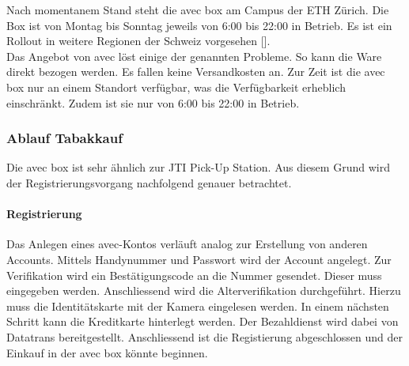  Nach momentanem Stand steht die avec box am Campus der ETH Zürich. Die Box ist von Montag bis Sonntag jeweils von 6:00 bis 22:00 in Betrieb. Es ist ein Rollout in weitere Regionen der Schweiz vorgesehen [\cite{avecBoxStand}].\\
 Das Angebot von avec löst einige der genannten Probleme. So kann die Ware direkt bezogen werden. Es fallen keine Versandkosten an. Zur Zeit ist die avec box nur an einem Standort verfügbar, was die Verfügbarkeit erheblich einschränkt. Zudem ist sie nur von 6:00 bis 22:00 in Betrieb. 
 
 \subsubsection{Ablauf Tabakkauf}
Die avec box ist sehr ähnlich zur JTI Pick-Up Station. Aus diesem Grund wird der Registrierungsvorgang nachfolgend genauer betrachtet. 
\paragraph{Registrierung}
Das Anlegen eines avec-Kontos verläuft analog zur Erstellung von anderen Accounts. Mittels Handynummer und Passwort wird der Account angelegt. Zur Verifikation wird ein Bestätigungscode an die Nummer gesendet. Dieser muss eingegeben werden. Anschliessend wird die Alterverifikation durchgeführt. Hierzu muss die Identitätskarte mit der Kamera eingelesen werden. In einem nächsten Schritt kann die Kreditkarte hinterlegt werden. Der Bezahldienst wird dabei von Datatrans bereitgestellt. Anschliessend ist die Registierung abgeschlossen und der Einkauf in der avec box könnte beginnen. \\

